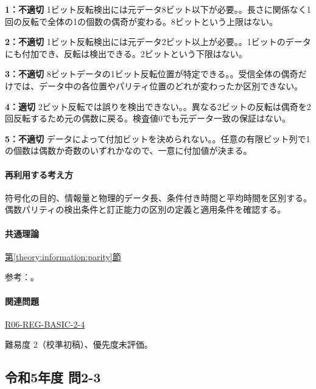 \noindent\textbf{1：不適切} 1ビット反転検出には元データ8ビット以下が必要。。長さに関係なく1回の反転で全体の1の個数の偶奇が変わる。8ビットという上限はない。\par

\noindent\textbf{2：不適切} 1ビット反転検出には元データ2ビット以上が必要。。1ビットのデータにも付加でき、反転は検出できる。2ビットという下限はない。\par

\noindent\textbf{3：不適切} 8ビットデータの1ビット反転位置が特定できる。。受信全体の偶奇だけでは、データ中の各位置やパリティ位置のどれが変わったか区別できない。\par

\noindent\textbf{4：適切} 2ビット反転では誤りを検出できない。。異なる2ビットの反転は偶奇を2回反転するため元の偶数に戻る。検査値0でも元データ一致の保証はない。\par

\noindent\textbf{5：不適切} データによって付加ビットを決められない。。任意の有限ビット列で1の個数は偶数か奇数のいずれかなので、一意に付加値が決まる。\par

\paragraph{再利用する考え方} 符号化の目的、情報量と物理的データ長、条件付き時間と平均時間を区別する。偶数パリティの検出条件と訂正能力の区別の定義と適用条件を確認する。

\paragraph{共通理論} \hyperref[theory:information:parity]{第\ref*{theory:information:parity}節}

\par 参考：\cite{info_errors}。

\paragraph{関連問題} \hyperref[q:r06-reg-basic-2-4]{R06-REG-BASIC-2-4}

\par 難易度 2（校準初稿）、優先度未評価。

\subsection{令和5年度 問2-3}
\label{q:r05-reg-basic-2-3}

